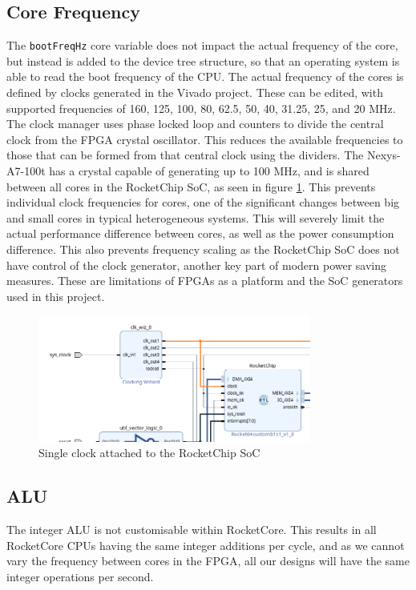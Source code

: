 \subsection{Core Frequency}
The \texttt{bootFreqHz} core variable does not impact the actual frequency of the core, but instead is added to the device tree structure, so that an operating system is able to read the boot frequency of the CPU. The actual frequency of the cores is defined by clocks generated in the Vivado project. These can be edited, with supported frequencies of 160, 125, 100, 80, 62.5, 50, 40, 31.25, 25, and 20 MHz. The clock manager uses phase locked loop and counters to divide the central clock from the FPGA crystal oscillator. This reduces the available frequencies to those that can be formed from that central clock using the dividers. The Nexys-A7-100t has a crystal capable of generating up to 100 MHz\cite{nexys-a7-100t}, and is shared between all cores in the RocketChip SoC, as seen in figure \ref{fig:rocketchip_clock}. This prevents individual clock frequencies for cores, one of the significant changes between big and small cores in typical heterogeneous systems. This will severely limit the actual performance difference between cores, as well as the power consumption difference. This also prevents frequency scaling as the RocketChip SoC does not have control of the clock generator, another key part of modern power saving measures. These are limitations of FPGAs as a platform and the SoC generators used in this project.

\begin{figure}[h!]
    \centering
    \includegraphics[width=0.8\textwidth]{./img/single_clock_rocketchip.png}
    \caption{Single clock attached to the RocketChip SoC}
    \label{fig:rocketchip_clock}
\end{figure}

\subsection{ALU} %
The integer ALU is not customisable within RocketCore. This results in all RocketCore CPUs having the same integer additions per cycle, and as we cannot vary the frequency between cores in the FPGA, all our designs will have the same integer operations per second.

